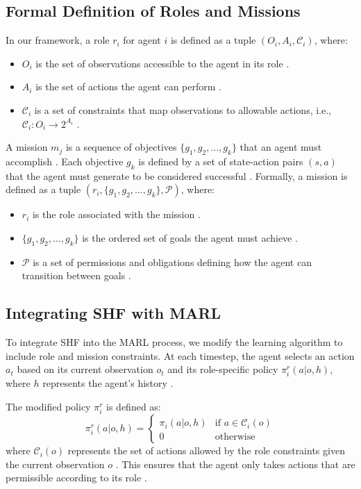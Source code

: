 \documentclass[sigconf,anonymous]{aamas}
\begin{document}
\subsection{Formal Definition of Roles and Missions}
In our framework, a role $r_i$ for agent $i$ is defined as a tuple $(O_i, A_i, \mathcal{C}_i)$, where:
\begin{itemize}
    \item $O_i$ is the set of observations accessible to the agent in its role \cite{hubner2010moise}.
    \item $A_i$ is the set of actions the agent can perform \cite{foerster2016learning}.
    \item $\mathcal{C}_i$ is a set of constraints that map observations to allowable actions, i.e., $\mathcal{C}_i: O_i \rightarrow 2^{A_i}$ \cite{hubner2010moise, castaneda2019policy}.
\end{itemize}

A mission $m_j$ is a sequence of objectives $\{g_1, g_2, ..., g_k\}$ that an agent must accomplish \cite{hubner2010moise}. Each objective $g_k$ is defined by a set of state-action pairs $(s, a)$ that the agent must generate to be considered successful \cite{hernandez2019survey}. Formally, a mission is defined as a tuple $(r_i, \{g_1, g_2, ..., g_k\}, \mathcal{P})$, where:
\begin{itemize}
    \item $r_i$ is the role associated with the mission \cite{hubner2010moise}.
    \item $\{g_1, g_2, ..., g_k\}$ is the ordered set of goals the agent must achieve \cite{hernandez2019survey}.
    \item $\mathcal{P}$ is a set of permissions and obligations defining how the agent can transition between goals \cite{hubner2010moise, castaneda2019policy}.
\end{itemize}

\subsection{Integrating SHF with MARL}
To integrate SHF into the MARL process, we modify the learning algorithm to include role and mission constraints. At each timestep, the agent selects an action $a_t$ based on its current observation $o_t$ and its role-specific policy $\pi_i^r(a | o, h)$, where $h$ represents the agent's history \cite{hubner2010moise}.

The modified policy $\pi_i^r$ is defined as:
\[
\pi_i^r(a | o, h) = 
\begin{cases}
\pi_i(a | o, h) & \text{if } a \in \mathcal{C}_i(o) \\
0 & \text{otherwise}
\end{cases}
\]
where $\mathcal{C}_i(o)$ represents the set of actions allowed by the role constraints given the current observation $o$ \cite{hubner2010moise}. This ensures that the agent only takes actions that are permissible according to its role \cite{hernandez2019survey, castaneda2019policy}.
\end{document}
